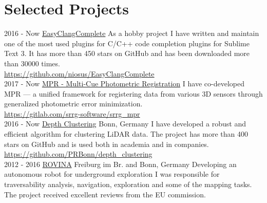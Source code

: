 \documentclass[]{friggeri-cv}
\begin{document}
\section{Selected Projects}
\begin{entrylist}
  \entry
    {2016 - Now}
    {\href{https://github.com/niosus/EasyClangComplete}{EasyClangComplete}}
    {}
    {As a hobby project I have written and maintain one of the most used plugins for C/C++ code completion plugins for Sublime Text 3. It has more than 450 stars on GitHub and has been downloaded more than 30000 times.\\\url{https://github.com/niosus/EasyClangComplete}\\}
  \entry
    {2017 - Now}
    {\href{https://gitlab.com/srrg-software/srrg_mpr}{MPR - Multi-Cue Photometric Registration}}
    {}
    {I have co-developed MPR --- a unified framework for registering data from various 3D sensors through generalized photometric error minimization.\\\url{https://gitlab.com/srrg-software/srrg_mpr}\\}
  \entry
    {2016 - Now}
    {\href{https://github.com/PRBonn/depth_clustering}{Depth Clustering}}
    {Bonn, Germany}
    {I have developed a robust and efficient algorithm for clustering LiDAR data. The project has more than 400 stars on GitHub and is used both in academia and in companies.\\\url{https://github.com/PRBonn/depth_clustering}\\}
  \entry
    {2012 - 2016}
    {\href{http://www.rovina-project.eu/}{ROVINA}}
    {Freiburg im Br. and Bonn, Germany}
    {Developing an autonomous robot for underground exploration I was responsible for traversability analysis, navigation, exploration and some of the mapping tasks. The project received excellent reviews from the EU commission.}
\end{entrylist}
\newpage
\end{document}

